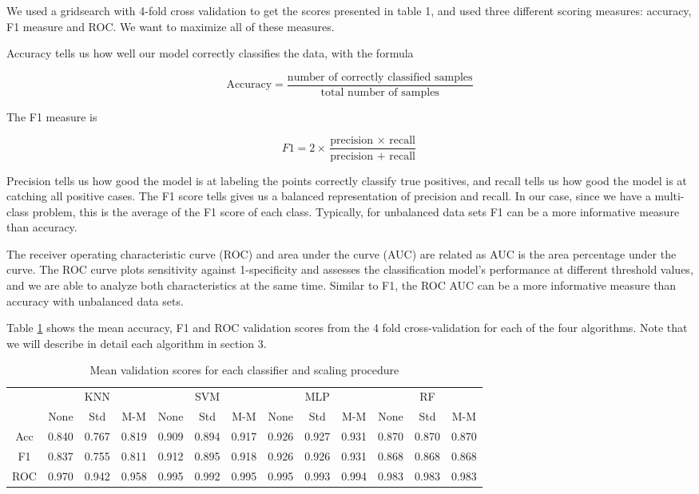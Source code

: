 \documentclass[12pt]{article}
\begin{document}
We used a gridsearch with 4-fold cross validation to get the scores presented in table 1, and used three different scoring measures: accuracy, F1 measure and ROC. We want to maximize all of these measures.

Accuracy tells us how well our model correctly classifies the data, with the formula 

\[\text{Accuracy}=\frac{\text{number of correctly classified samples}}{\text{total number of samples}}\] 

The F1 measure is 

\[F1=2\times\frac{\text{precision }\times \text{ recall}}{\text{precision }+\text{ recall}}\] 

Precision tells us how good the model is at labeling the points correctly classify true positives, and recall tells us how good the model is at catching all positive cases. The F1 score tells gives us a balanced representation of precision and recall. In our case, since we have a multi-class problem, this is the average of the F1 score of each class. Typically, for unbalanced data sets F1 can be a more informative measure than accuracy.

The receiver operating characteristic curve (ROC) and area under the curve (AUC) are related as AUC is the area percentage under the curve. The ROC curve plots sensitivity against 1-specificity and assesses the classification model's performance at different threshold values, and we are able to analyze both characteristics at the same time. Similar to F1, the ROC AUC can be a more informative measure than accuracy with unbalanced data sets.

Table \ref{table: 1} shows the mean accuracy, F1 and ROC validation scores from the 4 fold cross-validation for each of the four algorithms. Note that we will describe in detail each algorithm in section 3. 

\begin{table}[h!]
	\centering
	\begin{tabular}{| c|ccc| ccc| ccc| ccc|} 
		\hline
		&&KNN&&&SVM&&&MLP&&&RF&\\
		& None & Std & M-M & None & Std & M-M& None & Std & M-M& None & Std & M-M\\ \hline
		Acc & 0.840 & 0.767 & 0.819 &  0.909 & 0.894& 0.917& 0.926& 0.927& 0.931& 0.870& 0.870& 0.870\\ 
		F1 & 0.837 & 0.755 & 0.811& 0.912& 0.895& 0.918& 0.926& 0.926& 0.931& 0.868& 0.868&0.868\\
		ROC & 0.970 & 0.942 &  0.958&  0.995&0.992& 0.995&0.995& 0.993& 0.994 &0.983& 0.983& 0.983\\
		\hline
	\end{tabular}
	\caption{Mean validation scores for each classifier and scaling procedure}
	\label{table: 1}
\end{table}
\end{document}

